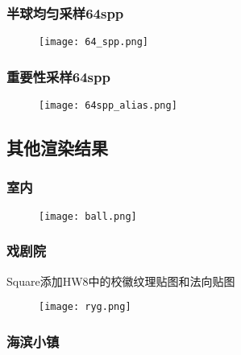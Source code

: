 \documentclass[14pt]{scrartcl} %
\begin{document}
\subsubsection{半球均匀采样64spp}
\begin{figure}[h] %
	\centering
	\texttt{[image: 64\_spp.png]} %
\end{figure}

\subsubsection{重要性采样64spp}

\begin{figure}[h] %
	\centering
	\texttt{[image: 64spp\_alias.png]} %
\end{figure}

\pagebreak
\subsection{其他渲染结果}

\subsubsection{室内}

\begin{figure}[h] %
	\centering
	\texttt{[image: ball.png]} %
\end{figure}

\subsubsection{戏剧院}
Square添加HW8中的校徽纹理贴图和法向贴图
\begin{figure}[h] %
	\centering
	\texttt{[image: ryg.png]} %
\end{figure}

\pagebreak

\subsubsection{海滨小镇}
\end{document}
